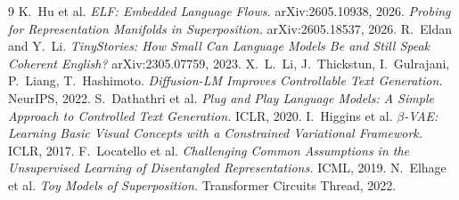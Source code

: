 \documentclass[11pt]{article}
\begin{document}
\begin{thebibliography}{9}
 K.~Hu et al. \emph{ELF: Embedded Language Flows.}
  arXiv:2605.10938, 2026.
 \emph{Probing for Representation Manifolds in Superposition.}
  arXiv:2605.18537, 2026.
 R.~Eldan and Y.~Li. \emph{TinyStories: How Small Can Language
  Models Be and Still Speak Coherent English?} arXiv:2305.07759, 2023.
 X.~L.~Li, J.~Thickstun, I.~Gulrajani, P.~Liang, T.~Hashimoto.
  \emph{Diffusion-LM Improves Controllable Text Generation.} NeurIPS, 2022.
 S.~Dathathri et al. \emph{Plug and Play Language Models: A Simple
  Approach to Controlled Text Generation.} ICLR, 2020.
 I.~Higgins et al. \emph{$\beta$-VAE: Learning Basic Visual Concepts
  with a Constrained Variational Framework.} ICLR, 2017.
 F.~Locatello et al. \emph{Challenging Common Assumptions in the
  Unsupervised Learning of Disentangled Representations.} ICML, 2019.
 N.~Elhage et al. \emph{Toy Models of Superposition.} Transformer
  Circuits Thread, 2022.
\end{thebibliography}
\end{document}
